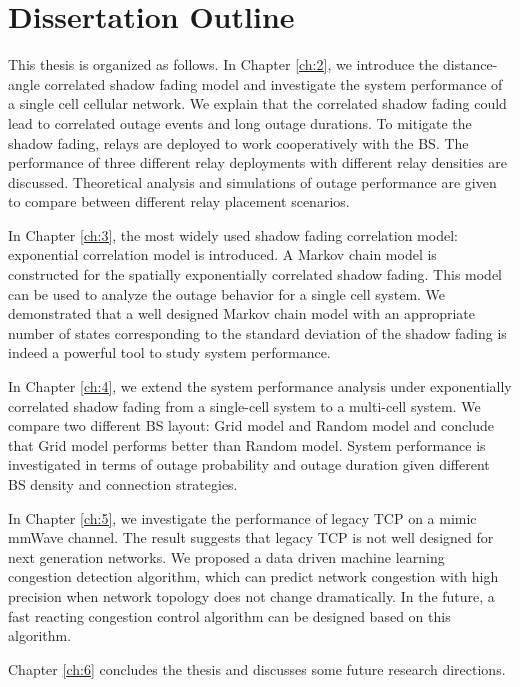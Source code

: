 \section{Dissertation Outline}
\par This thesis is organized as follows. In Chapter \ref{ch:2}, we introduce the distance-angle correlated shadow fading model and investigate the system performance of a single cell cellular network. We explain that the correlated shadow fading could lead to correlated outage events and long outage durations. To mitigate the shadow fading, relays are deployed to work cooperatively with the BS. The performance of three different relay deployments with different relay densities are discussed. Theoretical analysis and simulations of outage performance are given to compare between different relay placement scenarios. 
\par In Chapter \ref{ch:3}, the most widely used shadow fading correlation model: exponential correlation model is introduced. A Markov chain model is constructed for the spatially exponentially correlated shadow fading. This model can be used to analyze the outage behavior for a single cell system. We demonstrated that a well designed Markov chain model with an appropriate number of states corresponding to the standard deviation of the shadow fading is indeed a powerful tool to study system performance.
\par In Chapter \ref{ch:4}, we extend the system performance analysis under exponentially correlated shadow fading from a single-cell system to a multi-cell system. We compare two different BS layout: Grid model and Random model and conclude that Grid model performs better than Random model. System performance is investigated in terms of outage probability and outage duration given different BS density and connection strategies. 
\par In Chapter \ref{ch:5}, we investigate the performance of legacy TCP on a mimic mmWave channel. The result suggests that legacy TCP is not well designed for next generation networks. We proposed a data driven machine learning congestion detection algorithm, which can predict network congestion with high precision when network topology does not change dramatically. In the future, a fast reacting congestion control algorithm can be designed based on this algorithm.
\par Chapter \ref{ch:6} concludes the thesis and discusses some future research directions.








